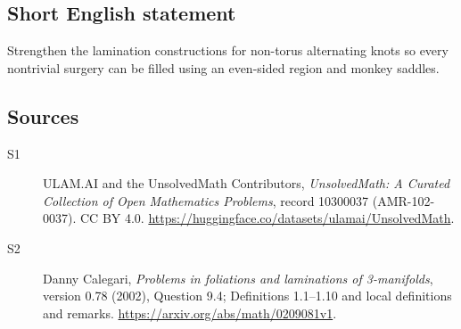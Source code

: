 \documentclass[11pt]{article}
\begin{document}
\subsection{Short English statement}
Strengthen the lamination constructions for non-torus alternating knots so every nontrivial surgery can be filled using an even-sided region and monkey saddles.
\subsection{Sources}
\begin{description}
\item[\hypertarget{source:10300037:1}{S1}] ULAM.AI and the UnsolvedMath Contributors, \emph{UnsolvedMath: A Curated Collection of Open Mathematics Problems}, record 10300037 (AMR-102-0037). CC BY 4.0. \url{https://huggingface.co/datasets/ulamai/UnsolvedMath}.
\item[\hypertarget{source:10300037:2}{S2}] Danny Calegari, \emph{Problems in foliations and laminations of 3-manifolds}, version 0.78 (2002), Question 9.4; Definitions 1.1--1.10 and local definitions and remarks. \url{https://arxiv.org/abs/math/0209081v1}.
\end{description}
\label{end:10300037}
\end{document}
